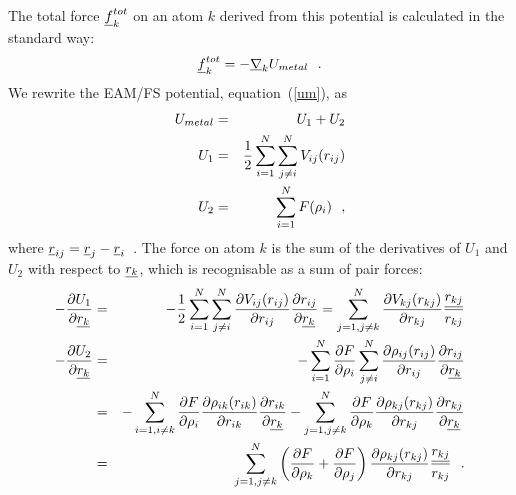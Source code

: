 The total force $\mbox{$\underline{f}$}_{k}^{tot}$ on an atom $k$ derived from this
potential is calculated in the standard way:
\begin{equation}
\mbox{$\underline{f}$}_{k}^{tot} = -\mbox{$\underline{\nabla}$}_{k} U_{metal}~~.
\end{equation}
We rewrite the EAM/FS potential, equation~(\ref{um}), as
\begin{eqnarray}
U_{metal} &=& U_{1} + U_{2} \nonumber \\
U_{1} &=& {1 \over 2} \sum_{i=1}^{N} \sum_{j \ne i}^{N} V_{ij}(r_{ij}) \\
U_{2} &=& \sum_{i=1}^{N} F(\rho_{i})~~, \nonumber
\end{eqnarray}
where $\mbox{$\underline{r}$}_{ij} = \mbox{$\underline{r}$}_{j}-\mbox{$\underline{r}$}_{i}$~.
The force on atom $k$ is the sum of the derivatives of $U_{1}$
and $U_{2}$ with respect to $\mbox{$\underline{r_{k}}$}$, which is recognisable as
a sum of pair forces:
\begin{eqnarray}
-\frac{\partial U_{1}}{\partial \mbox{$\underline{r_{k}}$}} &=& -{1 \over 2} \sum_{i=1}^{N} \sum_{j \ne i}^{N}
\frac{\partial V_{ij}(r_{ij})}{\partial r_{ij}} \frac{\partial r_{ij}}{\partial \mbox{$\underline{r_{k}}$}} =
\sum_{j=1,j \ne k}^{N} \frac{\partial V_{kj}(r_{kj})}{\partial r_{kj}} \frac{\mbox{$\underline{r_{kj}}$}}{r_{kj}} \nonumber \\
-\frac{\partial U_{2}}{\partial \mbox{$\underline{r_{k}}$}} &=& -\sum_{i=1}^{N} \frac{\partial F}{\partial \rho_{i}}
\sum_{j \ne i}^{N} \frac{\partial \rho_{ij}(r_{ij})}{\partial r_{ij}} \frac{\partial r_{ij}}{\partial \mbox{$\underline{r_{k}}$}} \\
&=& -\sum_{i=1,i \ne k}^{N} \frac{\partial F}{\partial \rho_{i}} \frac{\partial \rho_{ik}(r_{ik})}{\partial r_{ik}}
\frac{\partial r_{ik}}{\partial \mbox{$\underline{r_{k}}$}} - \sum_{j=1,j \ne k}^{N} \frac{\partial F}{\partial \rho_{k}}
\frac{\partial \rho_{kj}(r_{kj})}{\partial r_{kj}} \frac{\partial r_{kj}}{\partial \mbox{$\underline{r_{k}}$}} \nonumber \\
&=& \sum_{j=1,j \ne k}^{N} \left( \frac{\partial F}{\partial \rho_{k}} + \frac{\partial F}{\partial \rho_{j}} \right)
\frac{\partial \rho_{kj}(r_{kj})}{\partial r_{kj}} \frac{\mbox{$\underline{r_{kj}}$}}{r_{kj}}~~. \nonumber
\end{eqnarray}
